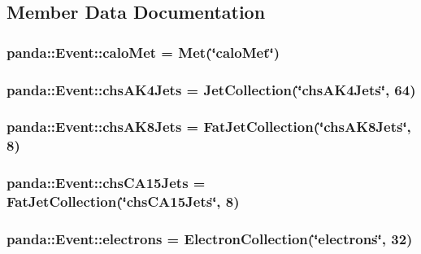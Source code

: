 \subsection{Member Data Documentation}
\hypertarget{classpanda_1_1Event_a15d30ed2e140f6f5bb8fd5a96737f129}{
\subsubsection[{caloMet}]{ {\bf panda::Event::caloMet} = {\bf Met}(\char`\"{}caloMet\char`\"{})}}
\label{classpanda_1_1Event_a15d30ed2e140f6f5bb8fd5a96737f129}
\hypertarget{classpanda_1_1Event_a822814d60c0df55807b04a1489fc3783}{
\subsubsection[{chsAK4Jets}]{ {\bf panda::Event::chsAK4Jets} = {\bf JetCollection}(\char`\"{}chsAK4Jets\char`\"{}, 64)}}
\label{classpanda_1_1Event_a822814d60c0df55807b04a1489fc3783}
\hypertarget{classpanda_1_1Event_a5887b3707f5bb76d2cda32c7e42d83f5}{
\subsubsection[{chsAK8Jets}]{ {\bf panda::Event::chsAK8Jets} = {\bf FatJetCollection}(\char`\"{}chsAK8Jets\char`\"{}, 8)}}
\label{classpanda_1_1Event_a5887b3707f5bb76d2cda32c7e42d83f5}
\hypertarget{classpanda_1_1Event_af49dd838ad102b13582e62cb63241262}{
\subsubsection[{chsCA15Jets}]{ {\bf panda::Event::chsCA15Jets} = {\bf FatJetCollection}(\char`\"{}chsCA15Jets\char`\"{}, 8)}}
\label{classpanda_1_1Event_af49dd838ad102b13582e62cb63241262}
\hypertarget{classpanda_1_1Event_ae032ee07dd410e6ce3579e7e530c65f7}{
\subsubsection[{electrons}]{ {\bf panda::Event::electrons} = {\bf ElectronCollection}(\char`\"{}electrons\char`\"{}, 32)}}
